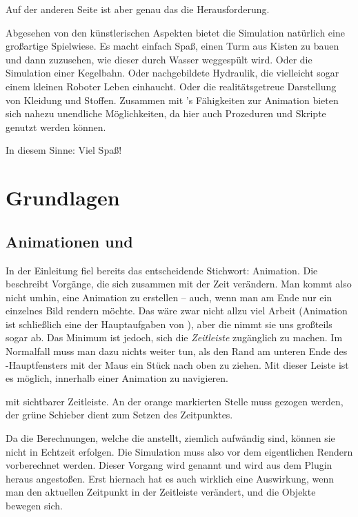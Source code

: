 \documentclass[10pt,DIV=14,a4paper]{scrartcl}
\begin{document}
Auf der anderen Seite ist aber genau das die Herausforderung.

Abgesehen von den künstlerischen Aspekten bietet die Simulation
natürlich eine großartige Spielwiese. Es macht einfach Spaß, einen Turm
aus Kisten zu bauen und dann zuzusehen, wie dieser durch Wasser
weggespült wird. Oder die Simulation einer Kegelbahn. Oder nachgebildete
Hydraulik, die vielleicht sogar einem kleinen Roboter Leben einhaucht.
Oder die realitätsgetreue Darstellung von Kleidung und Stoffen.
Zusammen mit \aoi's Fähigkeiten zur Animation bieten sich nahezu
unendliche Möglichkeiten, da hier auch Prozeduren und Skripte genutzt
werden können.

In diesem Sinne: Viel Spaß!



\pagebreak
\section{Grundlagen}

\subsection{Animationen und }
In der Einleitung fiel bereits das entscheidende Stichwort: Animation.
Die \fluidsim beschreibt Vorgänge, die sich zusammen mit der Zeit
verändern. Man kommt also nicht umhin, eine Animation zu erstellen --
auch, wenn man am Ende nur ein einzelnes Bild rendern möchte. Das wäre
zwar nicht allzu viel Arbeit (Animation ist schließlich eine der
Hauptaufgaben von \aoi), aber die \fluidsim nimmt sie uns großteils
sogar ab. Das Minimum ist jedoch, sich die \emph{Zeitleiste} zugänglich
zu machen. Im Normalfall muss man dazu nichts weiter tun, als den Rand
am unteren Ende des \aoi-Hauptfensters mit der Maus ein Stück nach oben
zu ziehen. Mit dieser Leiste ist es möglich, innerhalb einer Animation
zu navigieren.

{\aoi mit sichtbarer Zeitleiste. An der orange markierten Stelle muss
gezogen werden, der grüne Schieber dient zum Setzen des Zeitpunktes.}

Da die Berechnungen, welche die \fluidsim anstellt, ziemlich aufwändig
sind, können sie nicht in Echtzeit erfolgen. Die Simulation muss also
vor dem eigentlichen Rendern vorberechnet werden. Dieser Vorgang wird
 genannt und wird aus dem Plugin heraus angestoßen. Erst
hiernach hat es auch wirklich eine Auswirkung, wenn man den aktuellen
Zeitpunkt in der Zeitleiste verändert, und die Objekte bewegen sich.
\end{document}
